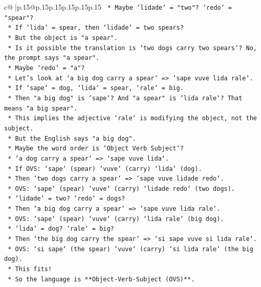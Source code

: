 \documentclass{article}
\begin{document}
{\begin{supertabular}{c@{$\;$}|p{.15\linewidth}@{}p{.15\linewidth}p{.15\linewidth}p{.15\linewidth}p{.15\linewidth}p{.15\linewidth}}
{{{\texttt{        *   Maybe `lidade` = "two"? `redo` = "spear"?} \\
\texttt{        *   If `lida` = spear, then `lidade` = two spears?} \\
\texttt{        *   But the object is "a spear".} \\
\texttt{        *   Is it possible the translation is `two dogs carry two spears`? No, the prompt says "a spear".} \\
\texttt{        *   Maybe `redo` = "a"?} \\
\texttt{        *   Let's look at `a big dog carry a spear` => `sape vuve lida rale`.} \\
\texttt{        *   If `sape` = dog, `lida` = spear, `rale` = big.} \\
\texttt{        *   Then "a big dog" is `sape`? And "a spear" is `lida rale`? That means "a big spear".} \\
\texttt{        *   This implies the adjective `rale` is modifying the object, not the subject.} \\
\texttt{        *   But the English says "a big dog".} \\
\texttt{        *   Maybe the word order is `Object Verb Subject`?} \\
\texttt{        *   `a dog carry a spear` => `sape vuve lida`.} \\
\texttt{        *   If OVS: `sape` (spear) `vuve` (carry) `lida` (dog).} \\
\texttt{        *   Then `two dogs carry a spear` => `sape vuve lidade redo`.} \\
\texttt{        *   OVS: `sape` (spear) `vuve` (carry) `lidade redo` (two dogs).} \\
\texttt{        *   `lidade` = two? `redo` = dogs?} \\
\texttt{        *   Then `a big dog carry a spear` => `sape vuve lida rale`.} \\
\texttt{        *   OVS: `sape` (spear) `vuve` (carry) `lida rale` (big dog).} \\
\texttt{        *   `lida` = dog? `rale` = big?} \\
\texttt{        *   Then `the big dog carry the spear` => `si sape vuve si lida rale`.} \\
\texttt{        *   OVS: `si sape` (the spear) `vuve` (carry) `si lida rale` (the big dog).} \\
\texttt{        *   This fits!} \\
\texttt{        *   So the language is **Object{-}Verb{-}Subject (OVS)**.} \\
}}}
\end{supertabular}}
\end{document}

